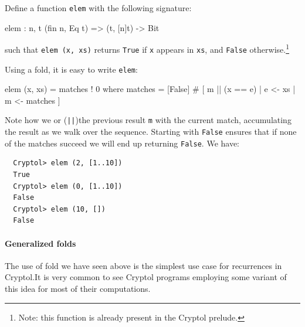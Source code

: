\begin{Exercise}\label{ex:recfun:4:1}
Define a function {\tt elem} with the following signature:\indElem
\begin{code}
  elem : {n, t} (fin n, Eq t) => (t, [n]t) -> Bit
\end{code}
such that {\tt elem (x, xs)} returns {\tt True} if {\tt x} appears in
{\tt xs}, and {\tt False} otherwise.\footnote{Note: this function
  is already present in the Cryptol prelude.}
\end{Exercise}
\begin{Answer}
Using a fold, it is easy to write {\tt elem}:
\begin{code}
  elem (x, xs) = matches ! 0
      where matches = [False] # [ m || (x == e) | e <- xs
                                                | m <- matches
                                ]
\end{code}
Note how we or ({\tt ||})\indOr the previous result {\tt m} with the
current match, accumulating the result as we walk over the
sequence. Starting with {\tt False} ensures that if none of the
matches succeed we will end up returning {\tt False}.  We have:
\begin{Verbatim}
  Cryptol> elem (2, [1..10])
  True
  Cryptol> elem (0, [1..10])
  False
  Cryptol> elem (10, [])
  False
\end{Verbatim}
\end{Answer}

\paragraph*{Generalized folds} The use of fold we have seen above is
the simplest use case for recurrences in Cryptol.\indFold\indComp It
is very common to see Cryptol programs employing some variant of this
idea for most of their computations.


